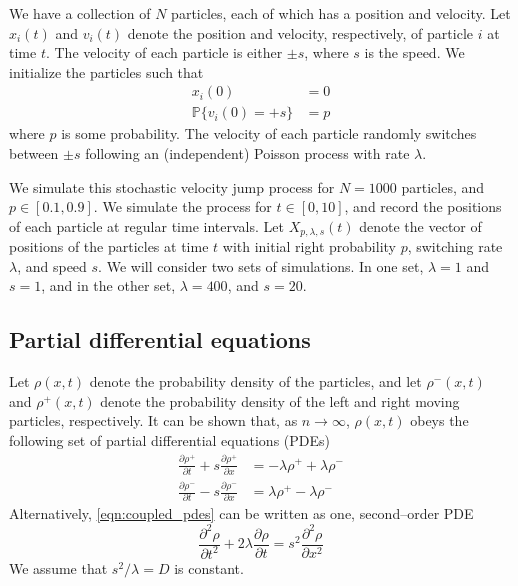 \documentclass[12pt]{article}
\begin{document}
We have a collection of $N$ particles, each of which has a position and velocity. 
%
Let $x_i(t)$ and $v_i(t)$ denote the position and velocity, respectively, of particle $i$ at time $t$.
%
The velocity of each particle is either $\pm s$, where $s$ is the speed. 
%
We initialize the particles such that
\begin{eqnarray}
x_i(0) & = 0 \\
\mathbb{P} \{ v_i(0) = +s \} & = p
\end{eqnarray}
where $p$ is some probability.
%
The velocity of each particle randomly switches between $\pm s$ following an (independent) Poisson process with rate $\lambda$.

We simulate this stochastic velocity jump process for $N=1000$ particles, and $p \in [0.1, 0.9]$.
%
We simulate the process for $t \in [0, 10]$, and record the positions of each particle at regular time intervals.
%
Let $X_{p, \lambda, s}(t)$ denote the vector of positions of the particles at time $t$ with initial right probability $p$, switching rate $\lambda$, and speed $s$.
%
We will consider two sets of simulations.
%
In one set, $\lambda = 1$ and $s=1$, and in the other set, $\lambda = 400$, and $s=20$.


\subsection{Partial differential equations}

Let $\rho(x, t)$ denote the probability density of the particles, and let $\rho^-(x, t)$ and $\rho^+(x, t)$ denote the probability density of the left and right moving particles, respectively.
%
It can be shown that, as $n \rightarrow \infty$, $\rho(x, t)$ obeys the following set of partial differential equations (PDEs)
\begin{eqnarray} \label{eqn:coupled_pdes}
\frac{\partial \rho^+}{\partial t} + s \frac{\partial \rho^+}{\partial x} & = -\lambda \rho^+ +\lambda \rho^- \\
\frac{\partial \rho^-}{\partial t} - s \frac{\partial \rho^-}{\partial x} & = \lambda \rho^+ -\lambda \rho^- 
\end{eqnarray}
%
Alternatively, \eqref{eqn:coupled_pdes} can be written as one, second--order PDE
\begin{equation} \label{eq:second_order_pde}
\frac{\partial^2 \rho}{\partial t^2} + 2 \lambda \frac{\partial \rho}{\partial t} = s^2 \frac{\partial ^2 \rho}{\partial x^2}
\end{equation}
%
We assume that $s^2/\lambda = D$ is constant.
\end{document}
